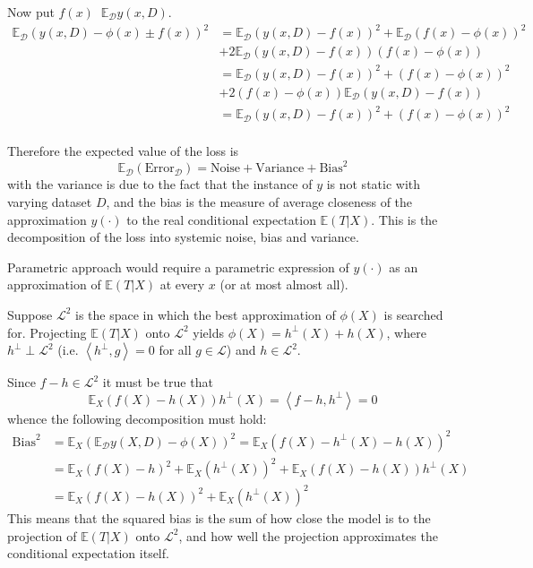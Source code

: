 \documentclass[a4paper]{article}
\newcommand{\brac}[1]{{\left ( #1 \right )}}
\newcommand{\induc}[1]{{\left . #1 \right \vert}}
\newcommand{\brkt}[1]{{\left\langle #1 \right\rangle}}
\newcommand{\Dcal}{\mathcal{D}}
\newcommand{\Lcal}{\mathcal{L}}
\newcommand{\Ex}[0]{{\mathbb{E}}}
\newcommand{\defn}{\mathop{\overset{\Delta}{=}}\nolimits}
\begin{document}
Now put $f(x) \defn \Ex_\Dcal y(x,D)$.
\begin{align*}
	\Ex_\Dcal\brac{ y(x,D)-\phi(x)\pm f(x) }^2 &
		= \Ex_\Dcal\brac{ y(x,D) - f(x) }^2 + \Ex_\Dcal\brac{ f(x) - \phi(x) }^2 \\ &+ 2 \Ex_\Dcal\brac{ y(x,D) - f(x) }\brac{ f(x) - \phi(x) } \\
		& = \Ex_\Dcal\brac{ y(x,D) - f(x) }^2 + \brac{ f(x) - \phi(x) }^2 \\&+ 2\brac{ f(x) - \phi(x) } \Ex_\Dcal\brac{ y(x,D) - f(x) } \\
		& = \Ex_\Dcal\brac{ y(x,D) - f(x) }^2 + \brac{ f(x) - \phi(x) }^2 \\
\end{align*}

Therefore the expected value of the loss is 
\[\Ex_\Dcal\brac{\text{Error}_\Dcal} = \text{Noise} + \text{Variance} + \text{Bias}^2\]
with the variance is due to the fact that the instance of $y$ is not static with varying dataset $D$,
and the bias is the measure of average closeness of the approximation $y(\cdot)$ to the real conditional expectation $\Ex\brac{\induc{T}X}$.
This is the decomposition of the loss into systemic noise, bias and variance.


Parametric approach would require a parametric expression of $y(\cdot)$ as an approximation of $\Ex\brac{\induc{T}X}$ at every $x$ (or at most almost all).

Suppose $\Lcal^2$ is the space in which the best approximation of $\phi(X)$ is searched for.
Projecting $\Ex\brac{\induc{T}X}$ onto $\Lcal^2$ yields $\phi(X) = h^\perp(X) + h(X)$, where $h^\perp \perp \Lcal^2$ (i.e. $\brkt{h^\perp,g} = 0$ for all $g\in \Lcal$) and $h\in \Lcal^2$.



Since $f-h\in\Lcal^2$ it must be true that
\[\Ex_X \brac{ f(X) - h(X) } h^\perp(X) = \brkt{f-h, h^\perp} = 0 \]
whence the following decomposition must hold:
\begin{align*}
	\text{Bias}^2 &= \Ex_X \brac{ \Ex_\Dcal y(X,D) - \phi(X) }^2 
		= \Ex_X \brac{ f(X) - h^\perp(X) - h(X) }^2 \\
		& = \Ex_X \brac{ f(X) - h }^2 + \Ex_X \brac{ h^\perp(X) }^2 + \Ex_X \brac{ f(X) - h(X) } h^\perp(X) \\
		& = \Ex_X \brac{ f(X) - h(X) }^2 + \Ex_X \brac{ h^\perp(X) }^2
\end{align*}
This means that the squared bias is the sum of how close the model is to the projection of $\Ex\brac{\induc{T}X}$ onto $\Lcal^2$, and how well the projection approximates the conditional expectation itself.
\end{document}

